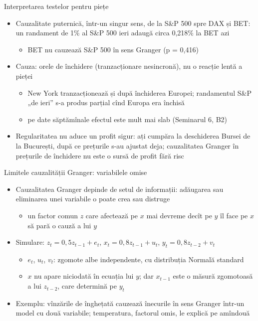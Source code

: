 \begin{frame}{Interpretarea testelor pentru piețe}
\itemsize{\small}
\begin{itemize}
    \item Cauzalitate puternică, într-un singur sens, de la S\&P 500 spre DAX și BET: un randament de 1\% al S\&P 500 ieri adaugă circa 0{,}218\% la BET azi
    \begin{itemize}
        \item BET nu cauzează S\&P 500 în sens Granger (p = 0{,}416)
    \end{itemize}
    \item Cauza: orele de închidere (tranzacționare nesincronă), nu o reacție lentă a pieței
    \begin{itemize}
        \item New York tranzacționează și după închiderea Europei; randamentul S\&P „de ieri” s-a produs parțial cînd Europa era închisă
        \item pe date săptămînale efectul este mult mai slab (Seminarul 6, B2)
    \end{itemize}
    \item Regularitatea nu aduce un profit sigur: ați cumpăra la deschiderea Bursei de la București, după ce prețurile s-au ajustat deja; cauzalitatea Granger în prețurile de închidere nu este o sursă de profit fără risc
\end{itemize}
\end{frame}

\begin{frame}{Limitele cauzalității Granger: variabilele omise}
\itemsize{\small}
\begin{itemize}
    \item Cauzalitatea Granger depinde de setul de informații: adăugarea sau eliminarea unei variabile o poate crea sau distruge 
    \begin{itemize}
        \item un factor comun $z$ care afectează pe $x$ mai devreme decît pe $y$ îl face pe $x$ să pară o cauză a lui $y$
    \end{itemize}
    \item Simulare: $z_t = 0{,}5z_{t-1} + e_t$, $x_t = 0{,}8z_{t-1} + u_t$, $y_t = 0{,}8z_{t-2} + v_t$
    \begin{itemize}
        \item $e_t$, $u_t$, $v_t$: zgomote albe independente, cu distribuția Normală standard
        \item $x$ nu apare niciodată în ecuația lui $y$; dar $x_{t-1}$ este o măsură zgomotoasă a lui $z_{t-2}$, care determină pe $y_t$
    \end{itemize}
    \item Exemplu: vînzările de înghețată cauzează înecurile în sens Granger într-un model cu două variabile; temperatura, factorul omis, le explică pe amîndouă
\end{itemize}
\end{frame}

